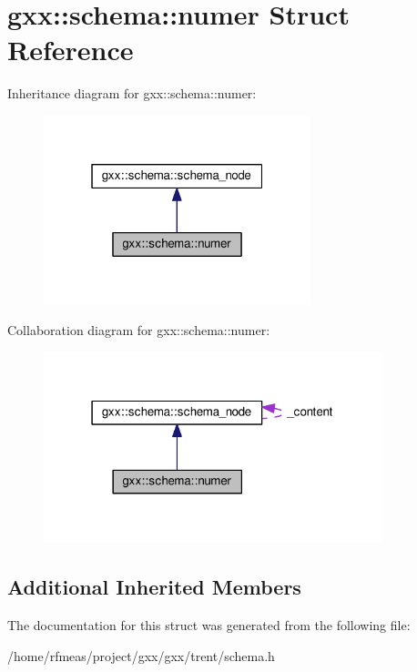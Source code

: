 \hypertarget{structgxx_1_1schema_1_1numer}{}\section{gxx\+:\+:schema\+:\+:numer Struct Reference}
\label{structgxx_1_1schema_1_1numer}


Inheritance diagram for gxx\+:\+:schema\+:\+:numer\+:
\nopagebreak
\begin{figure}[H]
\begin{center}
\leavevmode
\includegraphics[width=220pt]{structgxx_1_1schema_1_1numer__inherit__graph}
\end{center}
\end{figure}


Collaboration diagram for gxx\+:\+:schema\+:\+:numer\+:
\nopagebreak
\begin{figure}[H]
\begin{center}
\leavevmode
\includegraphics[width=279pt]{structgxx_1_1schema_1_1numer__coll__graph}
\end{center}
\end{figure}
\subsection*{Additional Inherited Members}


The documentation for this struct was generated from the following file\+:\begin{DoxyCompactItemize}
\item 
/home/rfmeas/project/gxx/gxx/trent/schema.\+h\end{DoxyCompactItemize}
